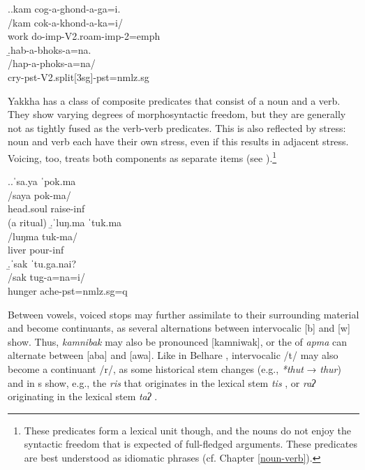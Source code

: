 \ex.\a.\glll kam cog-a-ghond-a-ga=i.\\
/kam cok-a-khond-a-ka=i/\\
work do{\sc -imp-V2.roam-imp-2=emph}\\
\b.\glll hab-a-bhoks-a=na.\\
/hap-a-phoks-a=na/\\
cry{\sc -pst-V2.split[3sg]-pst=nmlz.sg}\\

 

Yakkha has a class of composite predicates that consist of a noun and a verb. They show varying degrees of morphosyntactic freedom, but they are generally not as tightly fused as the  verb-verb predicates. This is also reflected by stress: noun and verb each have their own stress, even if this results in adjacent stress. Voicing, too, treats both components as separate items  (see \Next).\footnote{These predicates form a lexical unit though, and the nouns do not enjoy the syntactic freedom that is expected of full-fledged arguments. These predicates are best understood as idiomatic phrases (cf. Chapter \ref{noun-verb}).}

\ex.\a.\glll ˈsa.ya  ˈpok.ma\\
/saya pok-ma/\\
head.soul raise{\sc -inf}\\
 (a ritual)
\b.\glll  ˈluŋ.ma ˈtuk.ma\\
/luŋma tuk-ma/\\
liver pour{\sc -inf}\\
\b.\glll  ˈsak ˈtu.ga.nai?\\
/sak tug-a=na=i/\\
hunger ache{\sc [3sg]-pst=nmlz.sg=q}\\


Between vowels, voiced stops may further assimilate to their surrounding material and become continuants, as several alternations between intervocalic [b] and [w] show. Thus, \emph{kamnibak}  may also be pronounced [kamniwak], or the  of \emph{apma}  can alternate between [aba] and [awa]. Like in Belhare \citep{Bickel1998Rhythm}, intervocalic /t/ may also become a continuant /r/, as some historical stem changes (e.g., \emph{*thut} → \emph{thur}) and in s show, e.g., the  \emph{ris} that originates in the lexical stem \emph{tis} , or \emph{raʔ} originating in the lexical stem \emph{taʔ} . 


